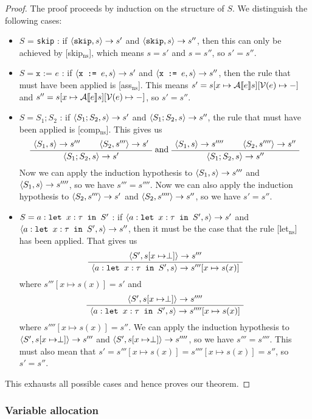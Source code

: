 \begin{proof}
The proof proceeds by induction on the structure of $S$. We distinguish the following cases:
\begin{itemize}[noitemsep]
    \item $S$ = \texttt{skip} : if $\langle \texttt{skip}, s \rangle \to s'$ and $\langle \texttt{skip}, s \rangle \to s''$, then this can only be achieved by [skip$_{\textrm{ns}}$], which means $s=s'$ and $s=s''$, so $s' = s''$. 
    \item $S = \texttt{x := }e$ : if $\langle \texttt{x := }e, s \rangle \to s'$ and $\langle \texttt{x := }e, s \rangle \to s''$, then the rule that must have been applied is [ass$_{\textrm{ns}}$]. This means $s'= s[x \mapsto \mathcal{A} \llbracket e \rrbracket s][\mathcal{V}(e)\mapsto-]$ and $s''=s[x \mapsto \mathcal{A} \llbracket e \rrbracket s][\mathcal{V}(e)\mapsto-]$, so $s'=s''$.
    \item $S = S_1; S_2$ : if $\langle S_1;S_2, s \rangle \to s'$ and $\langle S_1;S_2, s \rangle \to s''$, the rule that must have been applied is [comp$_{\textrm{ns}}$]. This gives us
    $$  \AxiomC{$\ns{S_1}{s}{s'''}$}
\AxiomC{$\ns{S_2}{s'''}{s'}$}
\BinaryInfC{$\ns{S_1; S_2}{s}{s'}$}
\DisplayProof
 \textrm{ and }
 \AxiomC{$\ns{S_1}{s}{s''''}$}
\AxiomC{$\ns{S_2}{s''''}{s''}$}
\BinaryInfC{$\ns{S_1; S_2}{s}{s''}$}
\DisplayProof$$
    Now we can apply the induction hypothesis to $\langle S_1, s \rangle \to s'''$ and $\langle S_1, s \rangle \to s''''$, so we have $s''' = s''''$. Now we can also apply the induction hypothesis to $\langle S_2, s''' \rangle \to s'$ and $\langle S_2, s'''' \rangle \to s''$, so we have $s' = s''$.
    \item $S = a : \texttt{let }x : \tau \texttt{ in } S'$ : if $\langle a : \texttt{let }x : \tau \texttt{ in } S', s \rangle \to s'$ and $\langle a : \texttt{let }x : \tau \texttt{ in } S', s \rangle \to s''$, then it must be the case that the rule [let$_{\textrm{ns}}$] has been applied. That gives us
    $$
    \AxiomC{$\ns{S'}{s[x\mapsto \perp]}{s'''}$}
\UnaryInfC{$\ns{\letm{x}{S'}}{s}{s'''[x \mapsto s(x)]}$}
\DisplayProof
    $$
    where $s'''[x \mapsto s(x)] = s'$ and
    $$\AxiomC{$\ns{S'}{s[x\mapsto \perp]}{s''''}$}
\UnaryInfC{$\ns{\letm{x}{S'}}{s}{s''''[x \mapsto s(x)]}$}
\DisplayProof
    $$
    where $s''''[x \mapsto s(x)] = s''$. 
    We can apply the induction hypothesis to $\langle S', s[x\mapsto \perp] \rangle \to s'''$ and $\langle S', s[x\mapsto \perp] \rangle \to s''''$, so we have $s''' = s''''$. This must also mean that $s' = s'''[x \mapsto s(x)] = s''''[x \mapsto s(x)] = s''$, so $s' = s''$.
\end{itemize}
This exhausts all possible cases and hence proves our theorem. 
\end{proof}

\subsubsection*{Variable allocation}

